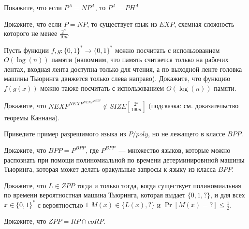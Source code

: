\setcounter{curtask}{55}



\begin{task}
    Покажите, что если $P^A = NP^A$, то $P^A = PH^A$
\end{task}

\begin{task}
    Докажите, что если $P = NP$, то существует язык из $EXP$, схемная сложность которого не менее $\frac{2^n}{10n}$.
\end{task}

\breakline

\begin{ptask}{41}
    Пусть функции $f, g: \{0, 1\}^* \rightarrow \{0, 1\}^*$ можно посчитать с
    использованием $O(\log(n))$ памяти (напомним, что память считается только на
    рабочих лентах, входная лента доступна только для чтения, а по выходной ленте
    головка машины Тьюринга движется только слева направо). Докажите, что функцию
    $f(g(x))$ можно также посчитать с использованием $O(\log(n))$ памяти.
\end{ptask}


\begin{ptask}{49}
    Докажите, что $NEXP^{NEXP^{NEXP^{NEXP}}} \notin SIZE[\frac{2^n}{100n}]$ (подсказка: см. доказательство теоремы Каннана).
\end{ptask}

\begin{ptask}{50}
    Приведите пример разрешимого языка из $P/poly$, но не лежащего в классе $BPP$.
\end{ptask}

\begin{ptask}{52}
    Докажите, что $BPP = P^{BPP}$, где $P^{BPP}$~--- множество языков, которые можно распознать при помощи полиномиальной по
    времени детерминировнной машины Тьюринга, которая может делать оракульные запросы к языку из класса $BPP$.
\end{ptask}

\begin{ptask}{53}
	Докажите, что $L \in ZPP$ тогда и только тогда, когда существует полиномиальная по времени вероятностная машина Тьюринга,
    которая выдает $\{0, 1, ?\}$, и для всех $x \in \{0, 1\}^*$ с вероятностью $1$ $M(x) \in \{L(x), ?\}$ и $\Pr[M(x) = ?] \le
    \frac{1}{2}$.
\end{ptask}

\begin{ptask}{54}
	Докажите, что $ZPP = RP \cap coRP$.
\end{ptask}
